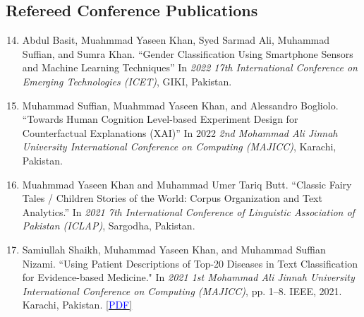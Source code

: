 \documentclass[10pt]{article}
\begin{document}
\subsection*{Refereed Conference Publications}
\begin{enumerate}
\setcounter{enumi}{13}
\itemsep=0em






\item Abdul Basit, Muahmmad Yaseen Khan, Syed Sarmad Ali, Muhammad Suffian, and Sumra Khan. ``Gender Classification Using Smartphone Sensors and Machine Learning Techniques'' In \emph{2022 17th International Conference on Emerging Technologies (ICET)}, GIKI, Pakistan.

\item Muhammad Suffian, Muahmmad Yaseen Khan, and Alessandro Bogliolo. ``Towards Human Cognition Level-based Experiment Design for Counterfactual Explanations (XAI)'' In 2022 \emph{2nd Mohammad Ali Jinnah University International Conference on Computing (MAJICC)}, Karachi, Pakistan.

\item Muahmmad Yaseen Khan and Muhammad Umer Tariq Butt. ``Classic Fairy Tales / Children Stories of the World: Corpus Organization and Text Analytics.'' In \emph{2021 7th International Conference of Linguistic Association of Pakistan (ICLAP)}, Sargodha, Pakistan.

\item Samiullah Shaikh, Muhammad Yaseen Khan, and Muhammad Suffian Nizami. ``Using Patient Descriptions of Top-20 Diseases in Text Classification for Evidence-based Medicine." In \emph{2021 1st Mohammad Ali Jinnah University International Conference on Computing (MAJICC)}, pp. 1--8. IEEE, 2021. Karachi, Pakistan. \href{https://ieeexplore.ieee.org/document/9526252}{\scshape\small [\textcolor{blue}{PDF}]}


\end{enumerate}
\end{document}
